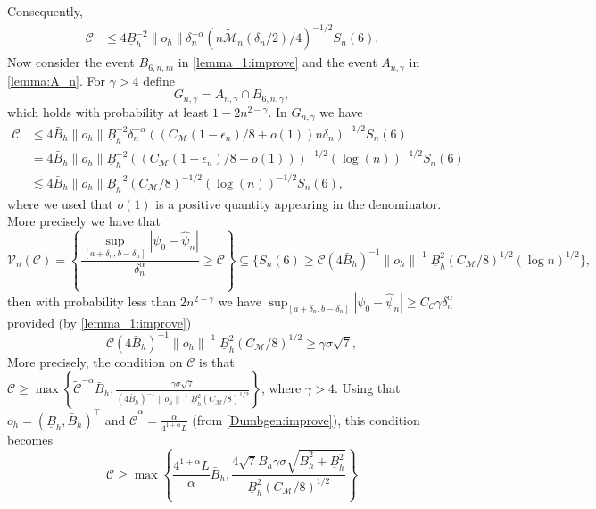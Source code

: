 \documentclass{article} %
\begin{document}
Consequently,
$$
\begin{aligned}
\mathscr{C} & \leq 4   \underline{B}_{h}^{-2} \|o_h\| \delta_n^{-{\alpha}}\left(n \widetilde{\mathscr{M}}_n\left(\delta_n / 2\right) / 4\right)^{-1 / 2} S_n(6).
\end{aligned}
$$
Now consider the event $B_{6,n,m}$ in \cref{lemma_1:improve} and the event $A_{n,\gamma}$ in \cref{lemma:A_n}. For $\gamma>4$ define
$$
G_{n,\gamma} = A_{n,\gamma} \cap B_{6,n,\gamma},
$$
which holds with probability at least $1-2n^{2-\gamma}$. In $G_{n,\gamma}$ we have
$$
\begin{aligned}
\mathscr{C} & \leq 4 \bar{B}_{h} \|o_h\| \underline{B}_{h}^{-2}  \delta_n^{-{\alpha}}\left((C_{\mathscr{M}}(1-\epsilon_n) / 8+o(1)) n \delta_n\right)^{-1 / 2}  S_n(6)\\
& = 4 \bar{B}_{h} \|o_h\| \underline{B}_{h}^{-2}  \left((C_{\mathscr{M}}(1-\epsilon_n) / 8+o(1))\right)^{-1 / 2} (\log(n))^{-1/2} S_n(6)\\
& \lesssim 4\bar{B}_{h} \|o_h\| \underline{B}_{h}^{-2}  \left(C_{\mathscr{M}} / 8\right)^{-1 / 2} (\log(n))^{-1/2} S_n(6),
\end{aligned}
$$
where we used that $o(1)$ is a positive quantity appearing in the denominator. More precisely we have that 
$$
\mathcal{V}_n(\mathscr{C}) = \left\{\frac{\sup_{\left[a+\delta_n, b-\delta_n\right]}|\psi_0-\widehat{\psi}_n|}{\delta_n^{\alpha}} \geq \mathscr{C} \right\} \subseteq \{ S_n(6) \geq \mathscr{C} (4\bar{B}_{h})^{-1} \|o_h\|^{-1} \underline{B}_{h}^{2}  \left(C_{\mathscr{M}} / 8\right)^{1 / 2}(\log n)^{1/2}\},
$$
then with probability less than $2n^{2-\gamma}$ we have $\sup_{\left[a+\delta_n, b-\delta_n\right]}|\psi_0-\widehat{\psi}_n|\geq C_{\mathscr{C}}\gamma \delta_n^{\alpha}$ provided (by \cref{lemma_1:improve})
$$
\mathscr{C} (4\bar{B}_{h})^{-1} \|o_h\|^{-1} \underline{B}_{h}^{2}  \left(C_{\mathscr{M}} / 8\right)^{1 / 2} \geq \gamma \sigma \sqrt{7},
$$
\noindent
More precisely, the condition on $\mathscr{C}$ is that $\mathscr{C} \geq \max\left\{\widetilde{\mathscr{C}}^{-\alpha}\bar{B}_{h}, \frac{\gamma \sigma \sqrt{7}}{(4\bar{B}_{h})^{-1} \|o_h\|^{-1} \underline{B}_{h}^{2}  \left(C_{\mathscr{M}} / 8\right)^{1 / 2}}\right\}$, where $\gamma>4$. Using that $o_h = (\underline{B}_{h},\bar{B}_{h})^{\top}$ and $\widetilde{\mathscr{C}}^{\alpha} = \frac{\alpha}{4^{1+\alpha}L} $ (from \cref{Dumbgen:improve}), this condition becomes 
$$
\mathscr{C} \geq \max\left\{\frac{4^{1+\alpha}L}{\alpha}\bar{B}_{h}, \frac{4\sqrt{7}\bar{B}_{h}\gamma \sigma  \sqrt{\bar{B}_{h}^2+\underline{B}_{h}^2}}{\underline{B}_{h}^{2}  \left(C_{\mathscr{M}} / 8\right)^{1 / 2}}\right\}
$$
\end{document}
